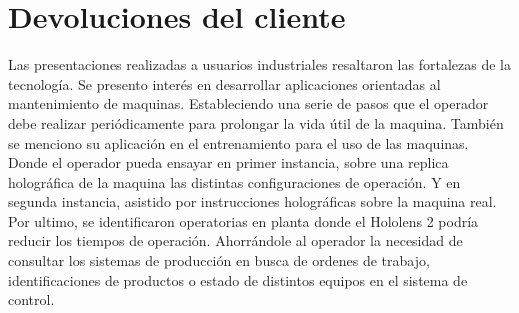 \section{Devoluciones del cliente}
Las presentaciones realizadas a usuarios industriales resaltaron las fortalezas de la tecnología. Se presento interés en desarrollar aplicaciones orientadas al mantenimiento de maquinas. Estableciendo una serie de pasos que el operador debe realizar periódicamente para prolongar la vida útil de la maquina. También se menciono su aplicación en el entrenamiento para el uso de las maquinas. Donde el operador pueda ensayar en primer instancia, sobre una replica holográfica de la maquina las distintas configuraciones de operación. Y en segunda instancia, asistido por instrucciones holográficas sobre la maquina real. Por ultimo, se identificaron operatorias en planta donde el Hololens 2 podría reducir los tiempos de operación. Ahorrándole al operador la necesidad de consultar los sistemas de producción en busca de ordenes de trabajo, identificaciones de productos o estado de distintos equipos en el sistema de control.